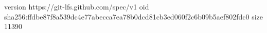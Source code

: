 version https://git-lfs.github.com/spec/v1
oid sha256:ffdbe87f8a539dc4e77abecca7ea78b0dcd81cb3ed060f2c6b09b5aef802fdc0
size 11390
